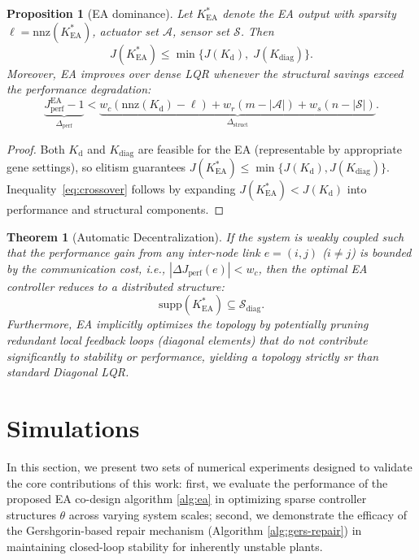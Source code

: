 \documentclass[conference]{IEEEtran}
\newtheorem{proposition}{Proposition}
\newtheorem{theorem}{Theorem}
\begin{document}
\begin{proposition}[EA dominance]\label{prop:ea-dom}
Let $K_{\mathrm{EA}}^*$ denote the EA output with sparsity
$\ell = \mathrm{nnz}(K_{\mathrm{EA}}^*)$, actuator set
$\mathcal{A}$, sensor set $\mathcal{S}$.  Then
\begin{equation}\label{eq:ea-dom}
  J(K_{\mathrm{EA}}^*) \leq \min\{J(K_\mathrm{d}),\; J(K_{\mathrm{diag}})\}.
\end{equation}
Moreover, EA improves over dense LQR whenever the
structural savings exceed the performance degradation:
\begin{equation}\label{eq:crossover}
  \underbrace{J_{\mathrm{perf}}^{\mathrm{EA}} - 1}_{\Delta_{\mathrm{perf}}}
  < \underbrace{w_c(\mathrm{nnz}(K_\mathrm{d}) - \ell)
  + w_r(m - |\mathcal{A}|)
  + w_s(n - |\mathcal{S}|)}_{\Delta_{\mathrm{struct}}}.
\end{equation}
\end{proposition}
\begin{proof}
Both $K_\mathrm{d}$ and $K_{\mathrm{diag}}$ are feasible for the EA
(representable by appropriate gene settings), so
elitism guarantees $J(K_{\mathrm{EA}}^*) \leq \min\{J(K_\mathrm{d}), J(K_{\mathrm{diag}})\}$.
Inequality~\eqref{eq:crossover} follows by expanding
$J(K_{\mathrm{EA}}^*) < J(K_\mathrm{d})$ into performance and structural components.
\end{proof}

\begin{theorem}[Automatic Decentralization]\label{thm:auto-dec}
If the system is weakly coupled such that the performance gain
from any inter-node link $e=(i,j)$ ($i \neq j$) is bounded by
the communication cost, i.e., $|\Delta J_{\mathrm{perf}}(e)| < w_c$,
then the optimal EA controller reduces to a distributed structure:
\begin{equation}
  \mathrm{supp}(K_{\mathrm{EA}}^*) \subseteq \mathcal{S}_{\mathrm{diag}}.
\end{equation}
Furthermore, EA implicitly optimizes the topology by potentially
pruning redundant local feedback loops (diagonal elements)
that do not contribute significantly to stability or performance,
yielding a topology strictly sr than standard Diagonal LQR.
\end{theorem}










\section{Simulations}
\label{simu}
In this section, we present two sets of numerical experiments designed to validate the core contributions of this work: first, we evaluate the performance of the proposed EA co-design algorithm \ref{alg:ea} in optimizing sparse controller structures $\theta$ across varying system scales; second, we demonstrate the efficacy of the Gershgorin-based repair mechanism (Algorithm \ref{alg:gers-repair}) in maintaining closed-loop stability for inherently unstable plants.
\end{document}

